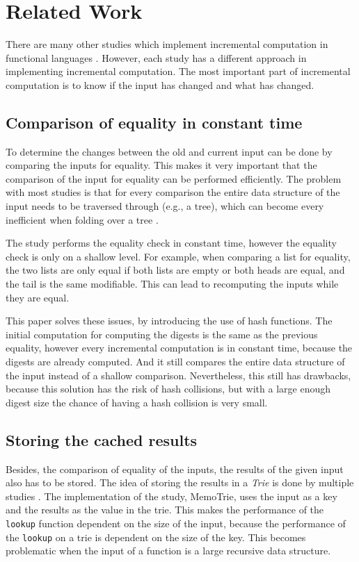 \section{Related Work}

There are many other studies which implement incremental computation in functional languages\cite*{hinze2000memo} \cite*{acar2006adaptive} \cite*{firsov2016purely} \cite*{carlsson2002monads}. However, each study has a different approach in implementing incremental computation. The most important part of incremental computation is to know if the input has changed and what has changed. 

\subsection{Comparison of equality in constant time}
To determine the changes between the old and current input can be done by comparing the inputs for equality. This makes it very important that the comparison of the input for equality can be performed efficiently. The problem with most studies is that for every comparison the entire data structure of the input needs to be traversed through (e.g., a tree), which can become every inefficient when folding over a tree \cite*{hinze2000memo} \cite*{bransen2015incremental}. 

The study \cite*{carlsson2002monads} performs the equality check in constant time, however the equality check is only on a shallow level. For example, when comparing a list for equality, the two lists are only equal if both lists are empty or both heads are equal, and the tail is the same modifiable. This can lead to recomputing the inputs while they are equal. 

This paper solves these issues, by introducing the use of hash functions. The initial computation for computing the digests is the same as the previous equality, however every incremental computation is in constant time, because the digests are already computed. And it still compares the entire data structure of the input instead of a shallow comparison. Nevertheless, this still has drawbacks, because this solution has the risk of hash collisions, but with a large enough digest size the chance of having a hash collision is very small.

\subsection{Storing the cached results}
Besides, the comparison of equality of the inputs, the results of the given input also has to be stored. The idea of storing the results in a \textit{Trie} is done by multiple studies \cite*{hinze2000memo} \cite*{miraldo2019efficient}. The implementation of the \cite*{hinze2000memo} study, MemoTrie\cite*{hackage2022memotrie}, uses the input as a key and the results as the value in the trie. This makes the performance of the \texttt{lookup} function dependent on the size of the input, because the performance of the \texttt{lookup} on a trie is dependent on the size of the key. This becomes problematic when the input of a function is a large recursive data structure. 

